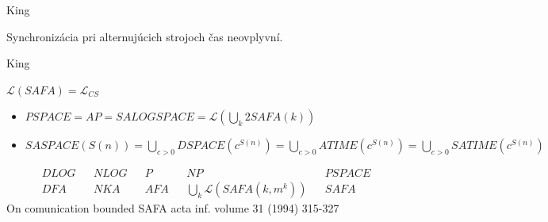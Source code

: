 King 

\begin{poznamka}
Synchronizácia pri alternujúcich strojoch čas neovplyvní.
\end{poznamka}

\begin{veta}
King

$\mathcal{L}(SAFA) = \mathcal{L}_{CS}$
\end{veta}

\begin{veta}
\begin{itemize}
\item $PSPACE = AP = SALOGSPACE = \mathcal{L}(\underset{{k}}{\bigcup} 2SAFA(k))$

\item $SASPACE(S(n)) = \underset{{c>0}}{\bigcup} DSPACE(c^{S(n)}) = \underset{{c>0}}{\bigcup} ATIME(c^{S(n)}) = \underset{{c>0}}{\bigcup} SATIME(c^{S(n)})$
\end{itemize}
\end{veta}

$$
\begin{aligned}
DLOG && NLOG && P   && NP                                  && PSPACE\\
DFA  && NKA  && AFA && \underset{{k}}{\bigcup} \mathcal{L}(SAFA(k, m^k)) && SAFA
\end{aligned}
$$
On comunication bounded SAFA acta inf. volume 31 (1994) 315-327
